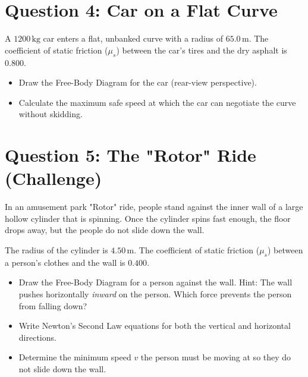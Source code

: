 \documentclass[12pt]{article}
\begin{document}
\newpage

\section*{Question 4: Car on a Flat Curve}

A $1200 \, \text{kg}$ car enters a flat, unbanked curve with a radius of $65.0 \, \text{m}$. The coefficient of static friction ($\mu_s$) between the car's tires and the dry asphalt is $0.800$. 

\begin{itemize}
\item[(a)] Draw the Free-Body Diagram for the car (rear-view perspective). 
\vspace{6cm}

\item[(b)] Calculate the maximum safe speed at which the car can negotiate the curve without skidding.
\vspace{8cm}

\end{itemize}

\newpage

\section*{Question 5: The "Rotor" Ride (Challenge)}

In an amusement park "Rotor" ride, people stand against the inner wall of a large hollow cylinder that is spinning. Once the cylinder spins fast enough, the floor drops away, but the people do not slide down the wall. 

The radius of the cylinder is $4.50 \, \text{m}$. The coefficient of static friction ($\mu_s$) between a person's clothes and the wall is $0.400$.

\begin{itemize}
\item[(a)] Draw the Free-Body Diagram for a person against the wall. Hint: The wall pushes horizontally \textit{inward} on the person. Which force prevents the person from falling down?
\vspace{6cm}

\item[(b)] Write Newton's Second Law equations for both the vertical and horizontal directions.
\vspace{6cm}

\item[(c)] Determine the minimum speed $v$ the person must be moving at so they do not slide down the wall.
\vspace{6cm}

\end{itemize}
\end{document}
